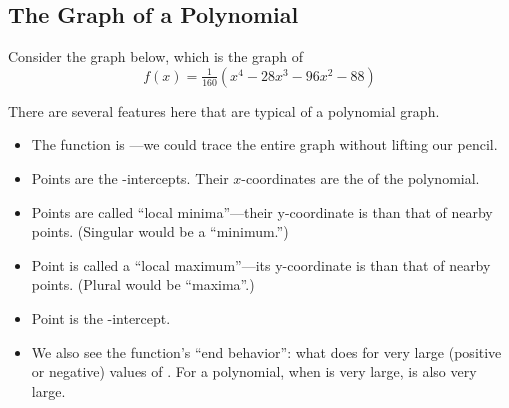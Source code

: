 \subsection{The Graph of a Polynomial} 
Consider the graph below, which is the graph of
\[
f(x)=\tfrac{1}{160}\left(x^4-28x^3-96x^2-88\right)
\]
\begin{center}\end{center}
There are several features here that are typical of a polynomial graph.
\begin{itemize}
\item The function is \makeblank[1.5in]---we could trace the entire graph without lifting our pencil.
\item Points \makeblank[2.5in] are the \makeblanksmall-intercepts. Their $x$-coordinates are the \makeblank[1in] of the polynomial.
\item Points \makeblank[1.5in] are called ``local minima''---their y-coordinate is \makeblank[1in] than that of nearby points. (Singular would be a ``minimum.'')
\item Point \makeblank[1.5in] is called a ``local maximum''---its y-coordinate is \makeblank[1in] than that of nearby points. (Plural would be ``maxima''.)
\item Point \makeblank[1in] is the \makeblanksmall-intercept.
\item We also see the function's ``end behavior'': what \makeblanksmall does for very large (positive or negative) values of \makeblanksmall. For a polynomial, when \makeblanksmall is very large, \makeblanksmall is also very large.
\end{itemize}